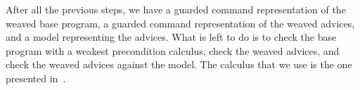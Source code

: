 After all the previous steps, we have a guarded command representation
of the weaved base program, a guarded command representation  of the 
weaved advices, and a model representing the advices.
What is left to do is to check the base program with a weakest precondition
calculus, check the weaved advices, and check the weaved advices against 
the model. The calculus that we use is the one presented in~\cite{BarnettL05}.
